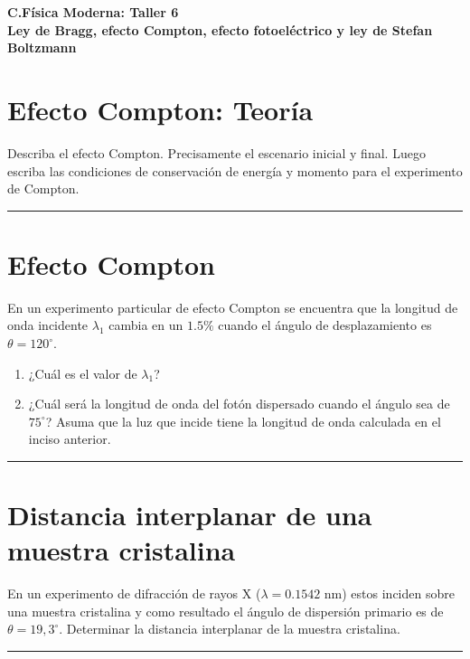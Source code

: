 \documentclass[12pt]{article}
\begin{document}
 
\begin{center}
\Large \textbf{C.Física Moderna: Taller 6}\\
\normalsize \textbf{Ley de Bragg, efecto Compton, efecto fotoeléctrico y ley de Stefan Boltzmann }
\end{center}
 
  

\section{Efecto Compton: Teoría }

Describa el efecto Compton. Precisamente el escenario inicial y final. Luego
escriba las condiciones de conservación de energía y momento para el
experimento de Compton.


\noindent\rule{16.5cm}{0.4pt}





\section{Efecto Compton}

	En un experimento particular de efecto Compton se encuentra que la
	longitud de onda incidente $\lambda_1$ cambia en un $1.5\%$ cuando el ángulo de
	desplazamiento es $\theta = 120^{\circ}$.
	
	\begin{enumerate}
		\item  ¿Cuál es el valor de $\lambda_1$?
		\item   ¿Cuál será la longitud
		de onda del fotón dispersado cuando el ángulo sea de $75^{\circ}$? Asuma que la luz que incide tiene la longitud de onda calculada en el inciso anterior.
	\end{enumerate}

\noindent\rule{16.5cm}{0.4pt}


\section{Distancia interplanar de una muestra cristalina}

	En un experimento de difracción de rayos X ($\lambda= 0.1542$ nm) estos inciden
	sobre una muestra cristalina y como resultado el ángulo de dispersión primario
	es de $\theta = 19,3^{\circ}$. Determinar la distancia interplanar de la muestra cristalina.

\noindent\rule{16.5cm}{0.4pt}
\end{document}
